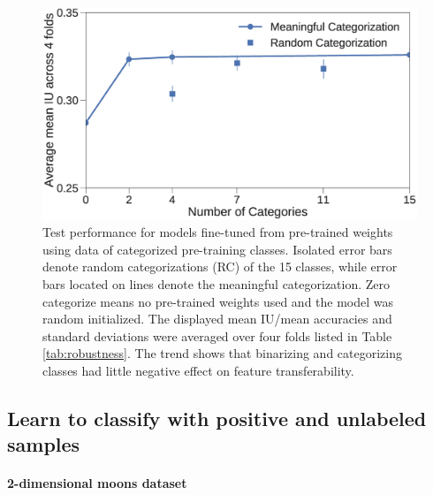 \begin{figure}[t]
\centering
   \includegraphics[width=1.\linewidth]{img/num_classes.eps}
\caption{
Test performance for models fine-tuned from pre-trained weights using data of categorized pre-training classes.
Isolated error bars denote random categorizations (RC) of the 15 classes, while error bars located on lines denote the meaningful categorization.
Zero categorize means no pre-trained weights used and the model was random initialized.
The displayed mean IU/mean accuracies and standard deviations were averaged over four folds listed in Table \ref{tab:robustness}.
The trend shows that binarizing and categorizing classes had little negative effect on feature transferability.
}
\label{fig:categories}
\end{figure}



\subsection{Learn to classify with positive and unlabeled samples}
\label{subsec:pulearning}


\paragraph{2-dimensional moons dataset}

